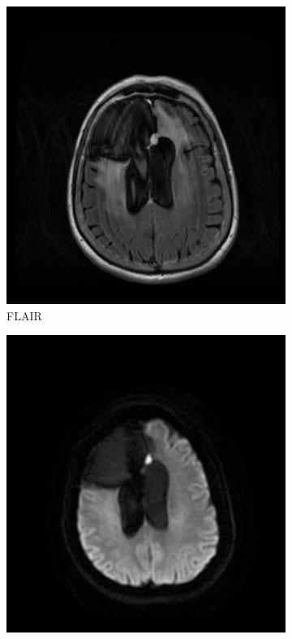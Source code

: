 \begin{figure}
\begin{subfigure}[t]{\figexamplewidth}
    \centering
    \includegraphics[width=\textwidth]{Figures/FLAIR}
    \caption{\gls{FLAIR}}\label{fig:FLAIR}
\end{subfigure}
\begin{subfigure}[t]{\figexamplewidth}
    \centering
    \includegraphics[width=\textwidth]{Figures/DWI}

\end{subfigure}
\end{figure}
